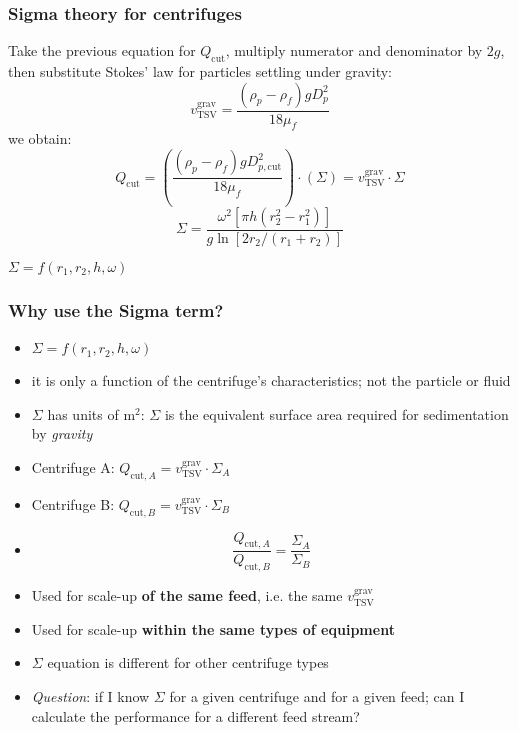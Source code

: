 \begin{frame}\frametitle{Sigma theory for centrifuges}
	Take the previous equation for $Q_\text{cut}$, multiply numerator and denominator by $2g$, then substitute Stokes' law for particles settling under gravity:
	\[
		v_\text{TSV}^\text{grav} = \frac{\left( \rho_p - \rho_f \right) g D_p^2}{18 \mu_f}
	\]
	we obtain:
	\[
		Q_\text{cut} =  \left( \frac{\left( \rho_p - \rho_f \right) g D_{p,\text{cut}}^2}{18 \mu_f}  \right) \cdot ( \Sigma ) =  v_\text{TSV}^\text{grav} \cdot \Sigma
	\]
	\[
		\Sigma = \frac{\omega^2 \left[\pi h \left(r_2^2 - r_1^2\right)\right]}{g \ln \left[2r_2/(r_1+r_2) \right]}
	\]

	\vspace{12pt}
	$\Sigma = f(r_1, r_2, h, \omega)$
\end{frame}

\begin{frame}\frametitle{Why use the Sigma term?}
	\begin{itemize}
		\item	$\Sigma = f(r_1, r_2, h, \omega)$
		\item	it is only a function of the centrifuge's characteristics; not the particle or fluid
		\item	$\Sigma$ has units of $\text{m}^2$: {\color{purple}$\Sigma$ is the equivalent surface area} required for sedimentation by \emph{gravity}
		\item	Centrifuge A: $Q_{\text{cut},A} = v_\text{TSV}^\text{grav} \cdot \Sigma_A$
		\item	Centrifuge B: $Q_{\text{cut},B} = v_\text{TSV}^\text{grav} \cdot \Sigma_B$
		\item	\[
					\frac{Q_{\text{cut},A}}{Q_{\text{cut},B}}  = \frac{\Sigma_A}{\Sigma_B}
				\]
		\item	Used for scale-up \textbf{of the same feed}, i.e. the same $v_\text{TSV}^\text{grav}$
		\item	Used for scale-up \textbf{within the same types of equipment}
		\item	$\Sigma$ equation is different for other centrifuge types
		\item	\emph{Question}: if I know $\Sigma$ for a given centrifuge and for a given feed; can I calculate the performance for a different feed stream?
	\end{itemize}
\end{frame}

